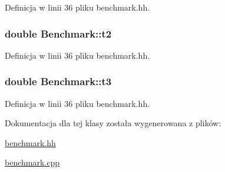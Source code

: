 \-Definicja w linii 36 pliku benchmark.\-hh.

\hypertarget{class_benchmark_a092579086c91c5debcb38890219e1b23}{
\subsubsection[{t2}]{\setlength{\rightskip}{0pt plus 5cm}double {\bf \-Benchmark\-::t2}}}\label{class_benchmark_a092579086c91c5debcb38890219e1b23}


\-Definicja w linii 36 pliku benchmark.\-hh.

\hypertarget{class_benchmark_a3ee434e226ad26d10ac3629e1d5b83f3}{
\subsubsection[{t3}]{\setlength{\rightskip}{0pt plus 5cm}double {\bf \-Benchmark\-::t3}}}\label{class_benchmark_a3ee434e226ad26d10ac3629e1d5b83f3}


\-Definicja w linii 36 pliku benchmark.\-hh.



\-Dokumentacja dla tej klasy została wygenerowana z plików\-:\begin{DoxyCompactItemize}
\item 
\hyperlink{benchmark_8hh}{benchmark.\-hh}\item 
\hyperlink{benchmark_8cpp}{benchmark.\-cpp}\end{DoxyCompactItemize}
